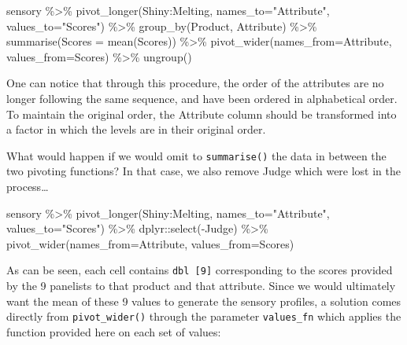 \documentclass[
]{book}
\newenvironment{Shaded}{\begin{snugshade}}{\end{snugshade}}
\newcommand{\AttributeTok}[1]{\textcolor[rgb]{0.77,0.63,0.00}{#1}}
\newcommand{\FunctionTok}[1]{\textcolor[rgb]{0.00,0.00,0.00}{#1}}
\newcommand{\NormalTok}[1]{#1}
\newcommand{\SpecialCharTok}[1]{\textcolor[rgb]{0.00,0.00,0.00}{#1}}
\newcommand{\StringTok}[1]{\textcolor[rgb]{0.31,0.60,0.02}{#1}}
\begin{document}
\begin{Shaded}
\begin{Highlighting}[]
\NormalTok{sensory }\SpecialCharTok{\%\textgreater{}\%} 
  \FunctionTok{pivot\_longer}\NormalTok{(Shiny}\SpecialCharTok{:}\NormalTok{Melting, }\AttributeTok{names\_to=}\StringTok{"Attribute"}\NormalTok{, }\AttributeTok{values\_to=}\StringTok{"Scores"}\NormalTok{) }\SpecialCharTok{\%\textgreater{}\%} 
  \FunctionTok{group\_by}\NormalTok{(Product, Attribute) }\SpecialCharTok{\%\textgreater{}\%} 
  \FunctionTok{summarise}\NormalTok{(}\AttributeTok{Scores =} \FunctionTok{mean}\NormalTok{(Scores)) }\SpecialCharTok{\%\textgreater{}\%} 
  \FunctionTok{pivot\_wider}\NormalTok{(}\AttributeTok{names\_from=}\NormalTok{Attribute, }\AttributeTok{values\_from=}\NormalTok{Scores) }\SpecialCharTok{\%\textgreater{}\%} 
  \FunctionTok{ungroup}\NormalTok{()}
\end{Highlighting}
\end{Shaded}

One can notice that through this procedure, the order of the attributes are no longer following the same sequence, and have been ordered in alphabetical order. To maintain the original order, the Attribute column should be transformed into a factor in which the levels are in their original order.

What would happen if we would omit to \texttt{summarise()} the data in between the two pivoting functions? In that case, we also remove Judge which were lost in the process\ldots{}

\begin{Shaded}
\begin{Highlighting}[]
\NormalTok{sensory }\SpecialCharTok{\%\textgreater{}\%} 
  \FunctionTok{pivot\_longer}\NormalTok{(Shiny}\SpecialCharTok{:}\NormalTok{Melting, }\AttributeTok{names\_to=}\StringTok{"Attribute"}\NormalTok{, }\AttributeTok{values\_to=}\StringTok{"Scores"}\NormalTok{) }\SpecialCharTok{\%\textgreater{}\%} 
\NormalTok{  dplyr}\SpecialCharTok{::}\FunctionTok{select}\NormalTok{(}\SpecialCharTok{{-}}\NormalTok{Judge) }\SpecialCharTok{\%\textgreater{}\%} 
  \FunctionTok{pivot\_wider}\NormalTok{(}\AttributeTok{names\_from=}\NormalTok{Attribute, }\AttributeTok{values\_from=}\NormalTok{Scores)}
\end{Highlighting}
\end{Shaded}

As can be seen, each cell contains \texttt{dbl\ {[}9{]}} corresponding to the scores provided by the 9 panelists to that product and that attribute. Since we would ultimately want the mean of these 9 values to generate the sensory profiles, a solution comes directly from \texttt{pivot\_wider()} through the parameter \texttt{values\_fn} which applies the function provided here on each set of values:
\end{document}
